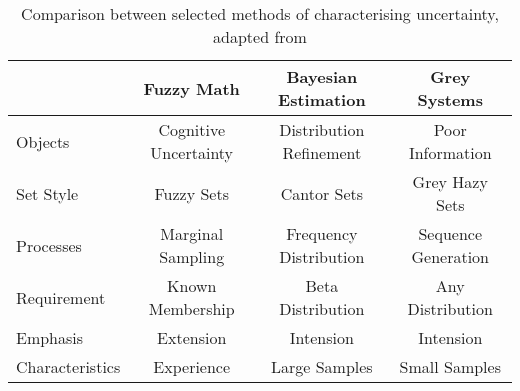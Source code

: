 \begin{table}[h]
  \caption{Comparison between selected methods of characterising uncertainty, adapted from \cite{Guo11} \cite{Liu2006} \cite{Ng1994} \cite{Wang2006} }
  \label{tab:uncertainty}
  \begin{center}
    \setlength{\tabcolsep}{8pt}
    \begin{tabular}{l|ccc}
      \toprule
        & Fuzzy Math & Bayesian Estimation & Grey Systems \\
      \midrule
      Objects & Cognitive Uncertainty & Distribution Refinement & Poor Information \\
      Set Style & Fuzzy Sets & Cantor Sets & Grey Hazy Sets \\
      Processes & Marginal Sampling & Frequency Distribution & Sequence Generation \\
      Requirement & Known Membership & Beta Distribution & Any Distribution \\
      Emphasis & Extension & Intension & Intension \\
      Characteristics & Experience & Large Samples & Small Samples\\
     \bottomrule
    \end{tabular}
    \setlength{\tabcolsep}{6pt}
  \end{center}
\end{table}

